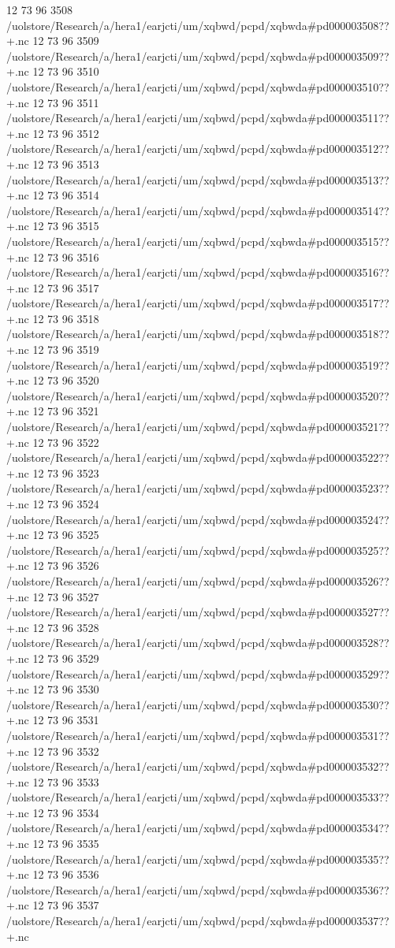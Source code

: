 12 73 96
3508
/uolstore/Research/a/hera1/earjcti/um/xqbwd/pcpd/xqbwda#pd000003508??+.nc
12 73 96
3509
/uolstore/Research/a/hera1/earjcti/um/xqbwd/pcpd/xqbwda#pd000003509??+.nc
12 73 96
3510
/uolstore/Research/a/hera1/earjcti/um/xqbwd/pcpd/xqbwda#pd000003510??+.nc
12 73 96
3511
/uolstore/Research/a/hera1/earjcti/um/xqbwd/pcpd/xqbwda#pd000003511??+.nc
12 73 96
3512
/uolstore/Research/a/hera1/earjcti/um/xqbwd/pcpd/xqbwda#pd000003512??+.nc
12 73 96
3513
/uolstore/Research/a/hera1/earjcti/um/xqbwd/pcpd/xqbwda#pd000003513??+.nc
12 73 96
3514
/uolstore/Research/a/hera1/earjcti/um/xqbwd/pcpd/xqbwda#pd000003514??+.nc
12 73 96
3515
/uolstore/Research/a/hera1/earjcti/um/xqbwd/pcpd/xqbwda#pd000003515??+.nc
12 73 96
3516
/uolstore/Research/a/hera1/earjcti/um/xqbwd/pcpd/xqbwda#pd000003516??+.nc
12 73 96
3517
/uolstore/Research/a/hera1/earjcti/um/xqbwd/pcpd/xqbwda#pd000003517??+.nc
12 73 96
3518
/uolstore/Research/a/hera1/earjcti/um/xqbwd/pcpd/xqbwda#pd000003518??+.nc
12 73 96
3519
/uolstore/Research/a/hera1/earjcti/um/xqbwd/pcpd/xqbwda#pd000003519??+.nc
12 73 96
3520
/uolstore/Research/a/hera1/earjcti/um/xqbwd/pcpd/xqbwda#pd000003520??+.nc
12 73 96
3521
/uolstore/Research/a/hera1/earjcti/um/xqbwd/pcpd/xqbwda#pd000003521??+.nc
12 73 96
3522
/uolstore/Research/a/hera1/earjcti/um/xqbwd/pcpd/xqbwda#pd000003522??+.nc
12 73 96
3523
/uolstore/Research/a/hera1/earjcti/um/xqbwd/pcpd/xqbwda#pd000003523??+.nc
12 73 96
3524
/uolstore/Research/a/hera1/earjcti/um/xqbwd/pcpd/xqbwda#pd000003524??+.nc
12 73 96
3525
/uolstore/Research/a/hera1/earjcti/um/xqbwd/pcpd/xqbwda#pd000003525??+.nc
12 73 96
3526
/uolstore/Research/a/hera1/earjcti/um/xqbwd/pcpd/xqbwda#pd000003526??+.nc
12 73 96
3527
/uolstore/Research/a/hera1/earjcti/um/xqbwd/pcpd/xqbwda#pd000003527??+.nc
12 73 96
3528
/uolstore/Research/a/hera1/earjcti/um/xqbwd/pcpd/xqbwda#pd000003528??+.nc
12 73 96
3529
/uolstore/Research/a/hera1/earjcti/um/xqbwd/pcpd/xqbwda#pd000003529??+.nc
12 73 96
3530
/uolstore/Research/a/hera1/earjcti/um/xqbwd/pcpd/xqbwda#pd000003530??+.nc
12 73 96
3531
/uolstore/Research/a/hera1/earjcti/um/xqbwd/pcpd/xqbwda#pd000003531??+.nc
12 73 96
3532
/uolstore/Research/a/hera1/earjcti/um/xqbwd/pcpd/xqbwda#pd000003532??+.nc
12 73 96
3533
/uolstore/Research/a/hera1/earjcti/um/xqbwd/pcpd/xqbwda#pd000003533??+.nc
12 73 96
3534
/uolstore/Research/a/hera1/earjcti/um/xqbwd/pcpd/xqbwda#pd000003534??+.nc
12 73 96
3535
/uolstore/Research/a/hera1/earjcti/um/xqbwd/pcpd/xqbwda#pd000003535??+.nc
12 73 96
3536
/uolstore/Research/a/hera1/earjcti/um/xqbwd/pcpd/xqbwda#pd000003536??+.nc
12 73 96
3537
/uolstore/Research/a/hera1/earjcti/um/xqbwd/pcpd/xqbwda#pd000003537??+.nc
